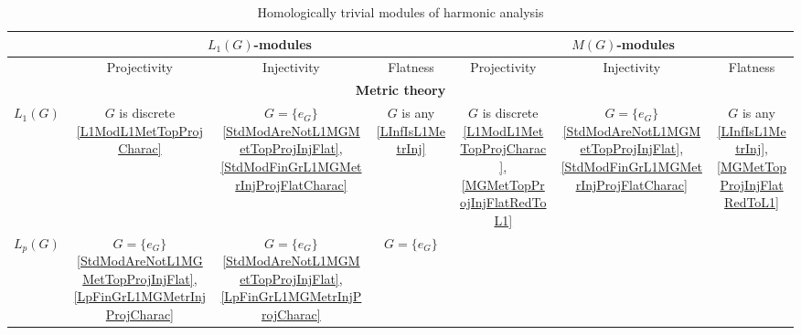 \documentclass{article}
\theoremstyle{plain}
\theoremstyle{definition}
\begin{document}
\begin{fulltext}
\begin{table}[ht]
    \centering
    \caption{Homologically trivial modules of harmonic analysis}
    \begin{tiny}
        \begin{tabular}{|c|c|c|c|c|c|c|}
        \hline
             & 
             \multicolumn{3}{c|}{$L_1(G)$-modules} & 
             \multicolumn{3}{c|}{$M(G)$-modules} \\
        \hline
             & 
             Projectivity & 
             Injectivity & 
             Flatness & 
             Projectivity & 
             Injectivity & 
             Flatness \\
        \hline
             \multicolumn{7}{c}{\textbf{Metric theory}} \\
        \hline
            $L_1(G)$ & 
            \shortstack{
                $G$ is discrete \\ 
                \ref{L1ModL1MetTopProjCharac}
            } & 
            \shortstack{
                $G=\{e_G\}$ \\ 
                \ref{StdModAreNotL1MGMetTopProjInjFlat}, 
                \ref{StdModFinGrL1MGMetrInjProjFlatCharac}
            } &
            \shortstack{
                $G$ is any \\ 
                \ref{LInfIsL1MetrInj}
            } &
            \shortstack{
                $G$ is discrete \\ 
                \ref{L1ModL1MetTopProjCharac},
                \ref{MGMetTopProjInjFlatRedToL1}
            } &
            \shortstack{
                $G=\{e_G\}$ \\
                \ref{StdModAreNotL1MGMetTopProjInjFlat},
                \ref{StdModFinGrL1MGMetrInjProjFlatCharac}
            } & 
            \shortstack{
                $G$ is any \\
                \ref{LInfIsL1MetrInj},
                \ref{MGMetTopProjInjFlatRedToL1}
            } \\
        \hline
             $L_p(G)$ & 
             \shortstack{
                $G=\{e_G\}$ \\ 
                \ref{StdModAreNotL1MGMetTopProjInjFlat},
                \ref{LpFinGrL1MGMetrInjProjCharac}
            } &
            \shortstack{
                $G=\{e_G\}$ \\ 
                \ref{StdModAreNotL1MGMetTopProjInjFlat},
                \ref{LpFinGrL1MGMetrInjProjCharac}
            } & 
            \shortstack{
                $G=\{e_G\}$ \\
}
\end{tabular}
\end{tiny}
\end{table}
\end{fulltext}
\end{document}
